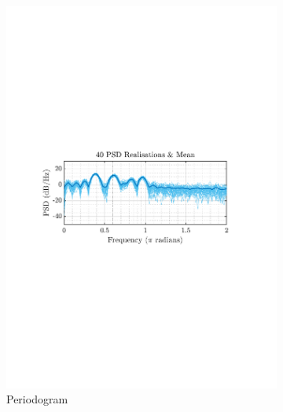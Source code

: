 \documentclass[12pt]{article}
\numberwithin{equation}{section}
\begin{document}
	\begin{figure}[H]
		\centering
		\begin{subfigure}{0.49\textwidth}
			\centering
			\includegraphics[trim={2.2cm 11.2cm 3.15cm  11.2cm}, clip, width=\textwidth]{../MATLAB/figures/q1_3c_fig01.pdf} 
			\captionsetup{justification=centering}
			\caption{Periodogram}
		\end{subfigure}
		\begin{subfigure}{0.49\textwidth}
			\centering

\end{subfigure}
\end{figure}
\end{document}
